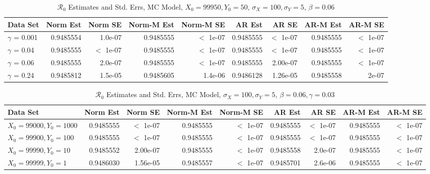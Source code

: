 \documentclass[12pt]{article}
\newcommand{\rr}{\ensuremath{\mathcal{R}_0}}
\begin{document}
\begin{table}[H]
	
	\caption{\label{tab:}$\rr$ Estimates and Std. Errs, MC Model,
		$X_0 = 99950, Y_0 = 50$, $\sigma_X = 100, \sigma_Y = 5$, $\beta = 0.06$}
	\centering
	\begin{footnotesize}
		\begin{tabular}[t]{l|r|r|r|r|r|r|r|r}
			\hline
			Data Set & Norm Est & Norm SE & Norm-M Est & Norm-M SE & AR Est & AR SE & AR-M Est & AR-M SE\\
			\hline
			$\gamma$ = 0.001 & 0.9485554 & 1.0e-07 & 0.9485555 & $<$ 1e-07 & 0.9485555 & $<$ 1e-07 & 0.9485555 & $<$ 1e-07\\
			\hline
			$\gamma$ = 0.04 & 0.9485555 & $<$ 1e-07 & 0.9485555 & $<$ 1e-07 & 0.9485555 & $<$ 1e-07 & 0.9485555 & $<$ 1e-07\\
			\hline
			$\gamma$ = 0.06 & 0.9485555 & 2.0e-07 & 0.9485555 & $<$ 1e-07 & 0.9485555 & 2.00e-07 & 0.9485555 & $<$ 1e-07\\
			\hline
			$\gamma$ = 0.24 & 0.9485812 & 1.5e-05 & 0.9485605 & 1.4e-06 & 0.9486128 & 1.26e-05 & 0.9485558 & 2e-07\\
			\hline
		\end{tabular}
	\end{footnotesize}
\end{table}

\begin{table}[H]
	
	\caption{\label{tab:}$\rr$ Estimates and Std. Errs, MC Model,
		$\sigma_X = 100, \sigma_Y = 5$, $\beta = 0.06, \gamma = 0.03$}
	\centering
	\begin{footnotesize}
		\begin{tabular}[t]{l|r|r|r|r|r|r|r|r}
			\hline
			Data Set & Norm Est & Norm SE & Norm-M Est & Norm-M SE & AR Est & AR SE & AR-M Est & AR-M SE\\
			\hline
			$X_0 = 99000, Y_0 = 1000$ & 0.9485555 & $<$ 1e-07 & 0.9485555 & $<$ 1e-07 & 0.9485555 & $<$ 1e-07 & 0.9485555 & $<$ 1e-07\\
			\hline
			$X_0 = 99900, Y_0 = 100$ & 0.9485555 & $<$ 1e-07 & 0.9485555 & $<$ 1e-07 & 0.9485555 & $<$ 1e-07 & 0.9485555 & $<$ 1e-07\\
			\hline
			$X_0 = 99990, Y_0 = 10$ & 0.9485552 & 2.00e-07 & 0.9485555 & $<$ 1e-07 & 0.9485558 & 2.0e-07 & 0.9485555 & $<$ 1e-07\\
			\hline
			$X_0 = 99999, Y_0 = 1$ & 0.9486030 & 1.56e-05 & 0.9485557 & $<$ 1e-07 & 0.9485701 & 2.6e-06 & 0.9485555 & $<$ 1e-07\\
			\hline
		\end{tabular}
	\end{footnotesize}
\end{table}
\end{document}
